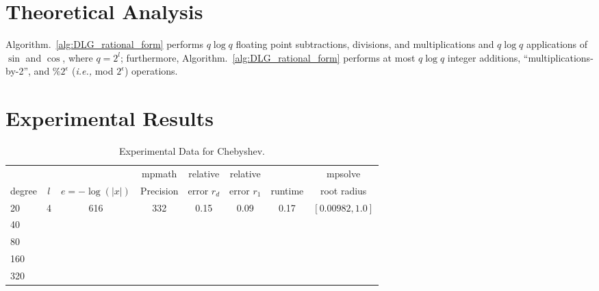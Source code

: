 \documentclass[sigconf]{acmart}
\begin{document}
\section{Theoretical Analysis}
\begin{theorem}
Algorithm.~\ref{alg:DLG_rational_form} performs $q \log q$ floating point subtractions, divisions, and multiplications and $q \log q$ applications of $\sin$ and $\cos$, where $q = 2^l$; furthermore, Algorithm.~\ref{alg:DLG_rational_form} performs at most $q \log q$  integer additions, ``multiplications-by-2'', and $ \%2^\epsilon $ (\emph{i.e.,} mod $ 2^\epsilon $) operations.
\end{theorem}
\section{Experimental Results}
\begin{table}[t]
\caption{Experimental Data for Chebyshev.}
\label{tab:chebyshev}
\vskip 0.15in
\begin{center}
\begin{small}
\begin{sc}
\begin{tabular}{lccccccc}
\toprule
&  &  & mpmath & relative  & relative &  & mpsolve \\
degree  & $l$& $e=-\log(|x|)$& Precision &error $r_d$       & error $r_1$ &runtime& root radius\\
\midrule
 20 & 4 &616 &332 & 0.15&0.09 &0.17 & $[0.00982, 1.0]$ \\
 40 & & & & & & & \\
 80 & & & & & & & \\
 160 & & & & & & & \\
 320 & & & & & & & \\
\bottomrule
\end{tabular}
\end{sc}
\end{small}
\end{center}
\vskip -0.1in
\end{table}
\end{document}
